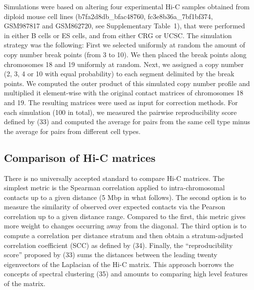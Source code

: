 \documentclass[a4,center,fleqn]{NAR}
\providecommand{\DIFadd}[1]{{\protect\color{red}#1}} %
\providecommand{\DIFdel}[1]{{\protect}}                      %
\providecommand{\DIFaddbegin}{} %
\providecommand{\DIFaddend}{} %
\providecommand{\DIFdelbegin}{} %
\providecommand{\DIFdelend}{} %
\begin{document}
\DIFadd{Simulations were based on altering four experimental Hi-C samples obtained
from diploid mouse cell lines (b7fa2d8db\_bfac48760, fc3e8b36a\_7bf1bf374,
GSM987817 and GSM862720, see Supplementary Table~1), that were performed
in either B cells or ES cells, and from either CRG or UCSC. The simulation
strategy was the following: First we selected uniformly at random the
amount of copy number break points (from 3 to 10). We then placed the
break points along chromosomes 18 and 19 uniformly at random. Next, we
assigned a copy number (2, 3, 4 or 10 with equal probability) to each
segment delimited by the break points. We computed the outer product of
this simulated copy number profile and multiplied it element-wise with the
original contact matrices of chromosomes 18 and 19. The resulting matrices
were used as input for correction methods. For each simulation (100 in
total), we measured the pairwise reproducibility score defined by
(33) and computed the average for pairs from the same
cell type minus the average for pairs from different cell types}\DIFaddend .

\subsection{Comparison of Hi-C matrices}
\DIFdelbegin %
\DIFdelend 

There is no universally accepted standard to compare Hi-C matrices. The
simplest metric is the Spearman correlation applied to intra-chromosomal
contacts up to a given distance (5 \DIFdelbegin \DIFdel{Mb }\DIFdelend \DIFaddbegin \DIFadd{Mbp }\DIFaddend in what follows). The second option
is to measure the similarity of observed over expected contacts via the
Pearson correlation up to a given distance range. Compared to the first,
this metric gives more weight to changes occurring away from the diagonal.
The third option is to compute a correlation per distance stratum and then
obtain a stratum-adjusted correlation coefficient (SCC) as defined by
(34). Finally, the \DIFdelbegin \DIFdel{last option, }\DIFdelend \DIFaddbegin \DIFadd{``reproducibility score'' }\DIFaddend proposed by
(\DIFdelbegin \DIFdel{35) is to measure the Pearson correlation between the last }\DIFdelend \DIFaddbegin \DIFadd{33) sums the distances between the leading twenty
}\DIFaddend eigenvectors of the Laplacian of the Hi-C matrix. This approach borrows
the concepts of spectral clustering (\DIFdelbegin \DIFdel{36}\DIFdelend \DIFaddbegin \DIFadd{35}\DIFaddend ) and amounts to
comparing high level features of the matrix.
\end{document}
